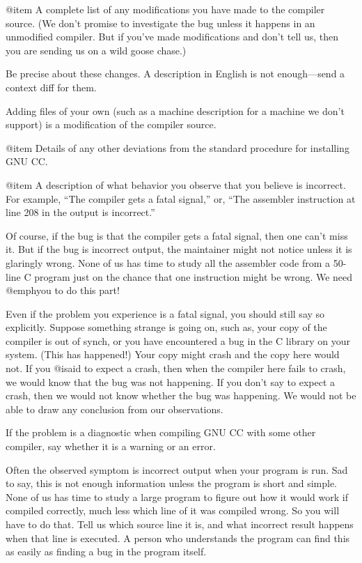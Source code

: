@item
A complete list of any modifications you have made to the compiler
source.  (We don't promise to investigate the bug unless it happens in
an unmodified compiler.  But if you've made modifications and don't tell
us, then you are sending us on a wild goose chase.)

Be precise about these changes.  A description in English is not
enough---send a context diff for them.

Adding files of your own (such as a machine description for a machine we
don't support) is a modification of the compiler source.

@item
Details of any other deviations from the standard procedure for installing
GNU CC.

@item
A description of what behavior you observe that you believe is
incorrect.  For example, ``The compiler gets a fatal signal,'' or,
``The assembler instruction at line 208 in the output is incorrect.''

Of course, if the bug is that the compiler gets a fatal signal, then one
can't miss it.  But if the bug is incorrect output, the maintainer might
not notice unless it is glaringly wrong.  None of us has time to study
all the assembler code from a 50-line C program just on the chance that
one instruction might be wrong.  We need @emph{you} to do this part!

Even if the problem you experience is a fatal signal, you should still
say so explicitly.  Suppose something strange is going on, such as, your
copy of the compiler is out of synch, or you have encountered a bug in
the C library on your system.  (This has happened!)  Your copy might
crash and the copy here would not.  If you @i{said} to expect a crash,
then when the compiler here fails to crash, we would know that the bug
was not happening.  If you don't say to expect a crash, then we would
not know whether the bug was happening.  We would not be able to draw
any conclusion from our observations.

If the problem is a diagnostic when compiling GNU CC with some other
compiler, say whether it is a warning or an error.

Often the observed symptom is incorrect output when your program is run.
Sad to say, this is not enough information unless the program is short
and simple.  None of us has time to study a large program to figure out
how it would work if compiled correctly, much less which line of it was
compiled wrong.  So you will have to do that.  Tell us which source line
it is, and what incorrect result happens when that line is executed.  A
person who understands the program can find this as easily as finding a
bug in the program itself.

